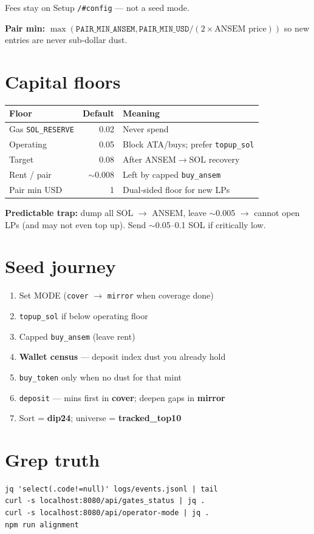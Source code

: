 Fees stay on Setup \texttt{/#config} --- not a seed mode.

\textbf{Pair min:} $\max(\texttt{PAIR\_MIN\_ANSEM}, \texttt{PAIR\_MIN\_USD}/(2\times\text{ANSEM price}))$
so new entries are never sub-dollar dust.

\section{Capital floors}

\begin{tabular}{lrl}
\textbf{Floor} & \textbf{Default} & \textbf{Meaning} \\
\hline
Gas \texttt{SOL\_RESERVE} & 0.02 & Never spend \\
Operating & 0.05 & Block ATA/buys; prefer \texttt{topup\_sol} \\
Target & 0.08 & After ANSEM$\to$SOL recovery \\
Rent / pair & $\sim$0.008 & Left by capped \texttt{buy\_ansem} \\
Pair min USD & 1 & Dual-sided floor for new LPs \\
\end{tabular}

\textbf{Predictable trap:} dump all SOL $\to$ ANSEM, leave $\sim$0.005 $\to$ cannot open LPs
(and may not even top up). Send $\sim$0.05--0.1 SOL if critically low.

\section{Seed journey}

\begin{enumerate}
  \item Set MODE (\texttt{cover} $\to$ \texttt{mirror} when coverage done)
  \item \texttt{topup\_sol} if below operating floor
  \item Capped \texttt{buy\_ansem} (leave rent)
  \item \textbf{Wallet census} --- deposit index dust you already hold
  \item \texttt{buy\_token} only when no dust for that mint
  \item \texttt{deposit} --- mins first in \textbf{cover}; deepen gaps in \textbf{mirror}
  \item Sort = \textbf{dip24}; universe = \textbf{tracked\_top10}
\end{enumerate}

\section{Grep truth}

\begin{verbatim}
jq 'select(.code!=null)' logs/events.jsonl | tail
curl -s localhost:8080/api/gates_status | jq .
curl -s localhost:8080/api/operator-mode | jq .
npm run alignment
\end{verbatim}
